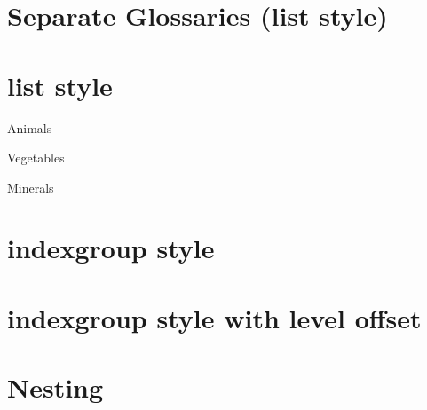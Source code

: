 \documentclass{report}
\begin{document}
\chapter{Separate Glossaries (list style)}
\printunsrtglossary[type=animal,title=Animals]
\printunsrtglossary[type=vegetable,title=Vegetables]
\printunsrtglossary[type=mineral,title=Minerals]

\chapter{list style}
\begin{printunsrtglossarywrap}[style=list]
\item[Animals]
\printunsrtinnerglossary[type=animal]{}{}
\item[Vegetables]
\printunsrtinnerglossary[type=vegetable]{}{}
\item[Minerals]
\printunsrtinnerglossary[type=mineral]{}{}
\end{printunsrtglossarywrap}

\chapter{indexgroup style}
\begin{printunsrtglossarywrap}[style=indexgroup]
\renewcommand*{\glsxtrgroupfield}{category}%
\printunsrtinnerglossary[type=animal]{}{\indexspace}
\printunsrtinnerglossary[type=vegetable]{}{\indexspace}
\printunsrtinnerglossary[type=mineral]{}{}
\end{printunsrtglossarywrap}

\chapter{indexgroup style with level offset}
\begin{printunsrtglossarywrap}[style=indexgroup]
\renewcommand*{\glsxtrgroupfield}{category}%
\printunsrtinnerglossary[type=animal,leveloffset=1]{}{\indexspace}
\printunsrtinnerglossary[type=vegetable,leveloffset=1]{}{\indexspace}
\printunsrtinnerglossary[type=mineral,leveloffset=1]{}{}
\end{printunsrtglossarywrap}

\chapter{Nesting}
\end{document}

